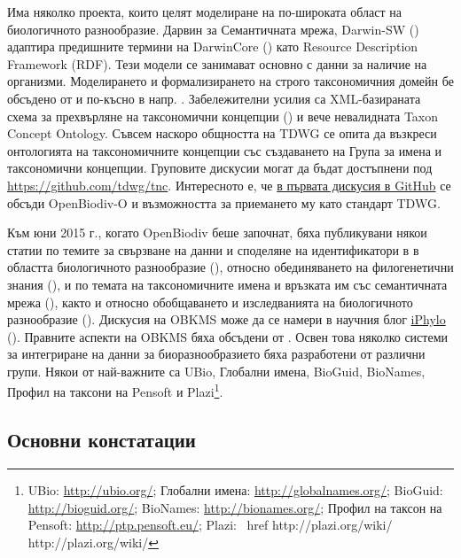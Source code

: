 Има няколко проекта, които целят моделиране на по-широката област на биологичното разнообразие. Дарвин за Семантичната мрежа, Darwin-SW (\cite{baskauf_darwin-sw:_2016}) адаптира предишните термини на DarwinCore (\cite{wieczorek_darwin_2012}) като Resource Description Framework (RDF). Тези модели се занимават основно с данни за наличие на организми. Моделирането и формализирането на строго таксономичния домейн бе обсъдено от \cite{berendsohn_concept_1995} и по-късно в напр. \cite{franz_perspectives:_2009, sterner_taxonomy_2017}. Забележителни усилия са XML-базираната схема за прехвърляне на таксономични концепции (\cite{taxonomic_names_and_concepts_interest_group_taxonomic_2006}) и вече невалидната Taxon Concept Ontology. Съвсем наскоро общността на TDWG се опита да възкреси онтологията на таксономичните концепции със създаването на Група за имена и таксономични концепции. Груповите дискусии могат да бъдат достъпнени под \url{https://github.com/tdwg/tnc}. Интересното е, че \href {https://github.com/tdwg/tnc/issues/1} {в първата дискусия в GitHub} се обсъди OpenBiodiv-O и възможността за приемането му като стандарт TDWG.

Към  юни 2015 г., когато OpenBiodiv беше започнат, бяха публикувани някои статии  по темите за свързване на данни и споделяне на идентификатори в в областта биологичното разнообразие (\cite{page_biodiversity_2008}), относно обединяването на филогенетични знания (\cite{parr_evolutionary_2012}), и по темата на таксономичните имена и връзката им със семантичната мрежа (\cite {page_taxonomic_2006, patterson_names_2010}), както и относно обобщаването и изследванията на биологичното разнообразие (\cite{mindell_aggregating_2011}). Дискусия на OBKMS може да се намери в научния блог \href {http://iphylo.blogspot.bg} {iPhylo} (\cite {page_vision_2014, page_putting_2015}). Правните аспекти на OBKMS бяха обсъдени от \cite {egloff_open_2014}. Освен това няколко системи за интегриране на данни за биоразнообразието бяха разработени от различни групи. Някои от най-важните са UBio, Глобални имена, BioGuid, BioNames, Профил на таксони на Pensoft и Plazi\footnote{UBio: \href{http://ubio.org/}{http://ubio.org/}; Глобални имена: \href {http://globalnames.org/}{http://globalnames.org/}; BioGuid: \href {http://bioguid.org/}{http://bioguid.org/}; BioNames: \href{http://bionames.org/}{http://bionames.org/}; Профил на таксон на Pensoft: \href {http://ptp.pensoft.eu/}{http://ptp.pensoft.eu/}; Plazi: \ href {http://plazi.org/wiki/} {http://plazi.org/wiki/}}.

\subsection*{Основни констатации}


